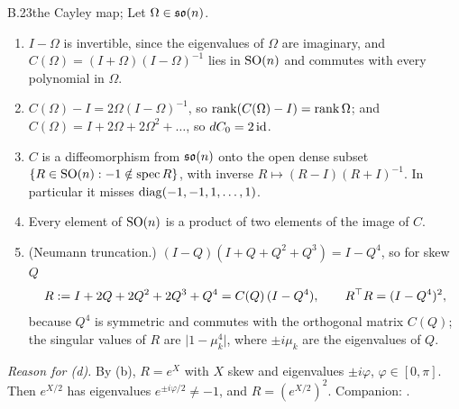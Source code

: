 \begin{auxresult}{B.23}{the Cayley map}{\citep{xcayley1846quelques}; \citep{lezcanocasado2019cheap}}
Let $\Omega\in\mathfrak{so}(n)$.
\begin{enumerate}[label=(\alph*)]
  \item $I-\Omega$ is invertible, since the eigenvalues of $\Omega$ are imaginary, and $C(\Omega)=(I+\Omega)(I-\Omega)^{-1}$
    lies in $\mathrm{SO}(n)$ and commutes with every polynomial in $\Omega$.
  \item $C(\Omega)-I=2\Omega(I-\Omega)^{-1}$, so $\operatorname{rank}(C(\Omega)-I)=\operatorname{rank}\Omega$; and $C(\Omega)=I+2\Omega+2\Omega^2+\dots$, so
    $dC_0=2\,\mathrm{id}$.
  \item $C$ is a diffeomorphism from $\mathfrak{so}(n)$ onto the open dense subset $\{R\in\mathrm{SO}(n):-1\notin\mathrm{spec}\,R\}$, with
    inverse $R\mapsto(R-I)(R+I)^{-1}$. In particular it misses $\operatorname{diag}(-1,-1,1,\dots,1)$.
  \item Every element of $\mathrm{SO}(n)$ is a product of two elements of the image of $C$.
  \item (Neumann truncation.) $(I-Q)(I+Q+Q^2+Q^3)=I-Q^4$, so for skew $Q$
    \begin{equation*}
      R:=I+2Q+2Q^2+2Q^3+Q^4=C(Q)\,(I-Q^4),\qquad R^{\top} R=(I-Q^4)^2 ,
    \end{equation*}
    because $Q^4$ is symmetric and commutes with the orthogonal matrix $C(Q)$; the singular values of $R$ are
    $\lvert1-\mu_k^4\rvert$, where $\pm i\mu_k$ are the eigenvalues of $Q$.
\end{enumerate}
\end{auxresult}
\noindent\emph{Reason for (d).} By (b), $R=e^X$ with $X$ skew and eigenvalues $\pm i\varphi$,
$\varphi\in[0,\pi]$. Then $e^{X/2}$ has eigenvalues $e^{\pm i\varphi/2}\ne-1$, and $R=(e^{X/2})^2$. Companion:
.

